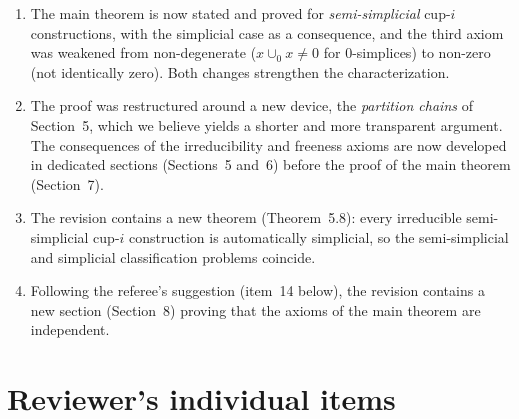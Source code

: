 \documentclass{amsart}
\begin{document}
	\begin{enumerate}
		\item The main theorem is now stated and proved for \emph{semi-simplicial} \mbox{cup-$i$} constructions, with the simplicial case as a consequence, and the third axiom was weakened from non-degenerate ($x \cup_0 x \neq 0$ for $0$-simplices) to non-zero (not identically zero).
		Both changes strengthen the characterization.

		\item The proof was restructured around a new device, the \emph{partition chains} of Section~5, which we believe yields a shorter and more transparent argument.
		The consequences of the irreducibility and freeness axioms are now developed in dedicated sections (Sections~5 and~6) before the proof of the main theorem (Section~7).

		\item The revision contains a new theorem (Theorem~5.8): every irreducible semi-simplicial \mbox{cup-$i$} construction is automatically simplicial, so the semi-simplicial and simplicial classification problems coincide.

		\item Following the referee's suggestion (item~14 below), the revision contains a new section (Section~8) proving that the axioms of the main theorem are independent.
	\end{enumerate}

	\section{Reviewer's individual items}
\end{document}
